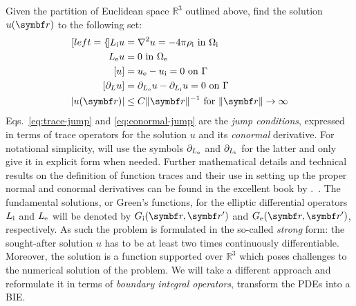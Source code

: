 Given the partition of Euclidean space $\mathbb{R}^3$ outlined above,
find the solution $u(\vect{r})$ to the following set:
\begin{subequations}\label{eq:transmission}
  \begin{align}[left={\empheqlbrace}]
  \Li u &= \nabla^2 u = -4\pi\rhoi \,\, \text{in}\,\, \Omegai \label{eq:internal} \\
  \Le u &= 0 \,\, \text{in}\,\, \Omegae \label{eq:external} \\
  [u] &= \ue - \ui = 0 \,\, \text{on}\,\, \Gamma
  \label{eq:trace-jump} \\
[\partial_L u] &= \partiale u - \partiali u = 0 \,\, \text{on}\,\, \Gamma \label{eq:conormal-jump} \\
|u(\vect{r})| &\leq C \|\vect{r} \|^{-1} \,\,\text{for}\,\,\| \vect{r} \|\rightarrow\infty
\label{eq:radiation}
\end{align}
\end{subequations}
Eqs.~\eqref{eq:trace-jump} and \eqref{eq:conormal-jump}
are the \emph{jump conditions}, expressed in terms of trace operators
for the solution $u$ and its \emph{conormal} derivative.
For notational simplicity, will use the symbols $\partial_{L_\mathrm{e}}$ and $\partial_{L_\mathrm{i}}$
for the latter and only give it in explicit form when needed.
Further mathematical details and technical results on the definition of
function traces and their use in setting up the proper normal and
conormal derivatives can be found in the excellent book by
\citeauthor{Sauter2011-an}.~\autocite{Sauter2011-an}.
The fundamental solutions, or Green's functions, for the elliptic
differential operators $L_\mathrm{i}$ and $L_\mathrm{e}$ will be denoted by $\Gi$ and
$\Ge$, respectively.
As such the problem is formulated in the so-called \emph{strong} form:
the sought-after solution $u$ has to be at least two times continuously
differentiable.
Moreover, the solution is a function supported over $\mathbb{R}^3$ which
poses challenges to the numerical solution of the problem.
We will take a different approach and reformulate it in terms of
\emph{boundary integral operators}, \ie transform the \acsp{PDE} into a
\gls{BIE}.

